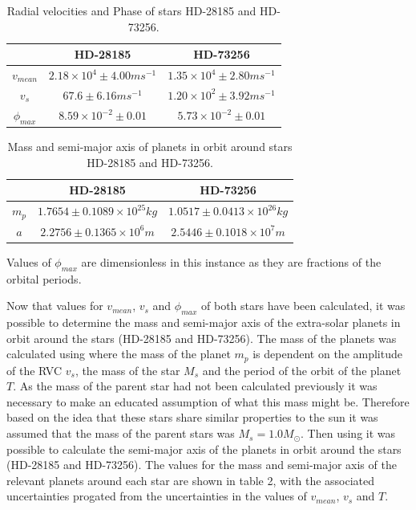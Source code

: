 \documentclass[]{article}
\begin{document}
\begin{table}[t]
    \begin{center}
      \caption{Radial velocities and Phase of stars HD-28185 and HD-73256.}
      \label{tab:table1}
      \begin{tabular}{c|c|c}
         & {HD-28185} & {HD-73256} \\
        \hline
        $v_{mean} $ & $ 2.18\times10^4 \pm4.00ms^{-1}$ & $1.35\times10^4\pm2.80ms^{-1}$ \\
        \hline
        $v_{s}$ & $67.6\pm6.16ms^{-1} $ & $1.20\times10^2\pm3.92ms^{-1}$\\
        \hline
        $\phi_{max}$ & $8.59\times10^{-2} \pm 0.01$ & $5.73\times10^{-2}\pm0.01$  \\
        
      \end{tabular}
    \end{center}
  \end{table}
\begin{table}[t]
    \begin{center}
      \caption{Mass and semi-major axis of planets in orbit around stars HD-28185 and HD-73256.}
      \label{tab:table2}
      \begin{tabular}{c|c|c}
         & {HD-28185} & {HD-73256} \\
        \hline
        $m_p$ & $1.7654\pm0.1089\times10^{25}kg$ & $1.0517\pm0.0413\times10^{26}kg$ \\
        \hline
        $a$ & $2.2756\pm0.1365\times10^{6}m$ & $2.5446\pm0.1018\times10^{7}m$\\
        
      \end{tabular}
    \end{center}
  \end{table}
Values of $\phi_{max}$ are dimensionless in this instance as they are
fractions of the orbital periods.
\par
Now that values for $v_{mean}$, $v_{s}$ and $\phi_{max}$ of both stars have 
been calculated, it was possible to determine the mass and semi-major axis of the
extra-solar planets in orbit around the stars (HD-28185 and HD-73256).
The mass of the planets was calculated using %
where the mass of the planet $m_p $ is dependent on the amplitude of the RVC $v_{s}$, the mass of the star $M_s$ and the period of the orbit of the planet $T$.
As the mass of the parent star had not been calculated previously it was necessary to
make an educated assumption of what this mass might be. Therefore based on the idea 
that these stars share similar properties to the sun it was assumed that the mass of
the parent stars was $M_s = 1.0M_{\odot}$. Then using %
it was possible to calculate the semi-major axis of the planets in orbit around the
stars (HD-28185 and HD-73256). The values for the mass and semi-major axis of the 
relevant planets around each star are shown in table 2, with the associated 
uncertainties progated from the uncertainties in the values of $v_{mean}$, $v_{s}$
and $T$.
\end{document}
